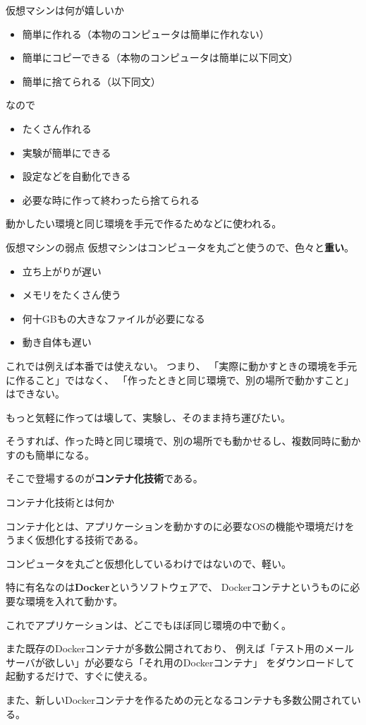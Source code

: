 \documentclass[12pt, unicode]{beamer}
\begin{document}
\begin{frame}{仮想マシンは何が嬉しいか}
\begin{itemize}
\item 簡単に作れる（本物のコンピュータは簡単に作れない）
\item 簡単にコピーできる（本物のコンピュータは簡単に以下同文）
\item 簡単に捨てられる（以下同文）
\end{itemize}

なので
\begin{itemize}
\item たくさん作れる
\item 実験が簡単にできる
\item 設定などを自動化できる
\item 必要な時に作って終わったら捨てられる
\end{itemize}

\vspace{1.0\baselineskip}

動かしたい環境と同じ環境を手元で作るためなどに使われる。
\end{frame}
\begin{frame}{仮想マシンの弱点}
仮想マシンはコンピュータを丸ごと使うので、色々と\textbf{重い}。

\begin{itemize}
\item 立ち上がりが遅い
\item メモリをたくさん使う
\item 何十GBもの大きなファイルが必要になる
\item 動き自体も遅い
\end{itemize}

これでは例えば本番では使えない。
つまり、
「実際に動かすときの環境を手元に作ること」ではなく、
「作ったときと同じ環境で、別の場所で動かすこと」
はできない。

もっと気軽に作っては壊して、実験し、そのまま持ち運びたい。

そうすれば、作った時と同じ環境で、別の場所でも動かせるし、複数同時に動かすのも簡単になる。

そこで登場するのが\textbf{コンテナ化技術}である。
\end{frame}
\begin{frame}{コンテナ化技術とは何か}

コンテナ化とは、アプリケーションを動かすのに必要なOSの機能や環境だけをうまく仮想化する技術である。

コンピュータを丸ごと仮想化しているわけではないので、軽い。

特に有名なのは\textbf{Docker}というソフトウェアで、
Dockerコンテナというものに必要な環境を入れて動かす。

これでアプリケーションは、どこでもほぼ同じ環境の中で動く。

また既存のDockerコンテナが多数公開されており、
例えば「テスト用のメールサーバが欲しい」が必要なら「それ用のDockerコンテナ」
をダウンロードして起動するだけで、すぐに使える。

また、新しいDockerコンテナを作るための元となるコンテナも多数公開されている。

\end{frame}
\end{document}
